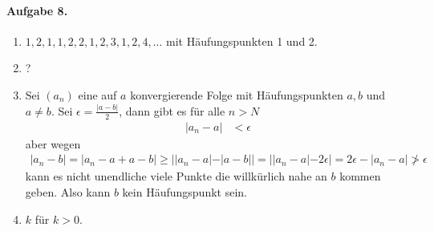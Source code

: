 \documentclass{article}
\begin{document}
\paragraph*{Aufgabe 8.}
\begin{enumerate}
    \item $1, 2, 1, 1, 2, 2, 1, 2, 3, 1, 2, 4, \ldots$ mit Häufungspunkten 1 und 2.

    \item ?

    \item Sei $(a_n)$ eine auf $a$ konvergierende Folge mit Häufungspunkten $a, b$ und $a \neq b$. Sei $\epsilon = \frac{|a - b|}{2}$, dann gibt es für alle $n > N$
    \begin{align*}
        |a_n - a| &< \epsilon
    \end{align*}
    aber wegen
    \begin{align*}
        |a_n - b| = |a_n - a + a - b| \geq ||a_n - a| - |a - b|| = ||a_n - a| - 2\epsilon| = 2\epsilon - |a_n - a| \not> \epsilon
    \end{align*}
    kann es nicht unendliche viele Punkte die willkürlich nahe an $b$ kommen geben. Also kann $b$ kein Häufungspunkt sein.

    \item $k$ für $k > 0$.
\end{enumerate}
\end{document}
